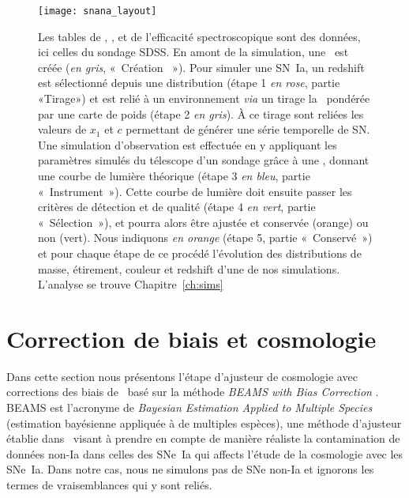 \documentclass[../main/main.tex]{subfiles}
\begin{document}
\begin{figure}[p]
    \vspace*{-3.2cm}
    \centerfloat
    \texttt{[image: snana\_layout]}
    \caption[Schéma de fonctionnement d'une simulation avec
    \snana]{\footnotesize Les tables de \wgtmap, \simlib, et de l'efficacité
        spectroscopique sont des données, ici celles du sondage SDSS. En amont
        de la simulation, une \hostlib\ est créée (\textit{en gris}, «~Création
        \hostlib~»). Pour simuler une SN~Ia, un redshift est sélectionné depuis
        une distribution (étape 1 \textit{en rose}, partie «Tirage») et est
        relié à un environnement \textit{via} un tirage la \hostlib\ pondérée
        par une carte de poids (étape 2 \textit{en gris}). À ce tirage sont
        reliées les valeurs de $x_1$ et $c$ permettant de générer une série
        temporelle de SN. Une simulation d'observation est effectuée en y
        appliquant les paramètres simulés du télescope d'un sondage grâce à une
        \simlib, donnant une courbe de lumière théorique (étape 3 \textit{en
        bleu}, partie «~Instrument~»). Cette courbe de lumière doit ensuite
        passer les critères de détection et de qualité (étape 4 \textit{en
        vert}, partie «~Sélection~»), et pourra alors être ajustée et conservée
        (orange) ou non (vert). Nous indiquons \textit{en orange} (étape 5,
        partie «~Conservé~») et pour chaque étape de ce procédé l'évolution des
        distributions de masse, étirement, couleur et redshift d'une de nos
    simulations. L'analyse se trouve Chapitre~\ref{ch:sims}}
    \label{fig:snana_func}
\end{figure}

\section{Correction de biais et cosmologie}\label{sec:biais}

Dans cette section nous présentons l'étape d'ajusteur de cosmologie avec
corrections des biais de \snana\ basé sur la méthode \textit{BEAMS with Bias
Correction} \citep[\bbc,][]{kessler2017}. BEAMS est l'acronyme de
\textit{Bayesian Estimation Applied to Multiple Species} (estimation bayésienne
appliquée à de multiples espèces), une méthode d'ajusteur établie
dans~\cite{kunz2007} visant à prendre en compte de manière réaliste la
contamination de données non-Ia dans celles des SNe~Ia qui affects l'étude de la
cosmologie avec les SNe~Ia. Dans notre cas, nous ne simulons pas de SNe non-Ia
et ignorons les termes de vraisemblances qui y sont reliés.
\end{document}
